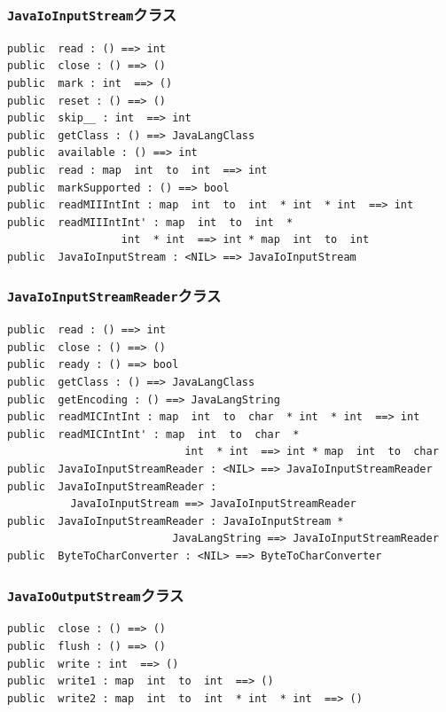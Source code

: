 \documentclass[\pformat,12pt]{jarticle}
\begin{document}
\subsubsection{\texttt{JavaIoInputStream}クラス}
\begin{small}
\begin{verbatim}
public  read : () ==> int
public  close : () ==> ()
public  mark : int  ==> ()
public  reset : () ==> ()
public  skip__ : int  ==> int
public  getClass : () ==> JavaLangClass
public  available : () ==> int
public  read : map  int  to  int  ==> int
public  markSupported : () ==> bool
public  readMIIIntInt : map  int  to  int  * int  * int  ==> int
public  readMIIIntInt' : map  int  to  int  * 
                  int  * int  ==> int * map  int  to  int
public  JavaIoInputStream : <NIL> ==> JavaIoInputStream
\end{verbatim}
\end{small}

\subsubsection{\texttt{JavaIoInputStreamReader}クラス}
\begin{small}
\begin{verbatim}
public  read : () ==> int
public  close : () ==> ()
public  ready : () ==> bool
public  getClass : () ==> JavaLangClass
public  getEncoding : () ==> JavaLangString
public  readMICIntInt : map  int  to  char  * int  * int  ==> int
public  readMICIntInt' : map  int  to  char  * 
                            int  * int  ==> int * map  int  to  char
public  JavaIoInputStreamReader : <NIL> ==> JavaIoInputStreamReader
public  JavaIoInputStreamReader : 
          JavaIoInputStream ==> JavaIoInputStreamReader
public  JavaIoInputStreamReader : JavaIoInputStream * 
                          JavaLangString ==> JavaIoInputStreamReader
public  ByteToCharConverter : <NIL> ==> ByteToCharConverter
\end{verbatim}
\end{small}

\subsubsection{\texttt{JavaIoOutputStream}クラス}
\begin{small}
\begin{verbatim}
public  close : () ==> ()
public  flush : () ==> ()
public  write : int  ==> ()
public  write1 : map  int  to  int  ==> ()
public  write2 : map  int  to  int  * int  * int  ==> ()
\end{verbatim}
\end{small}
\end{document}
